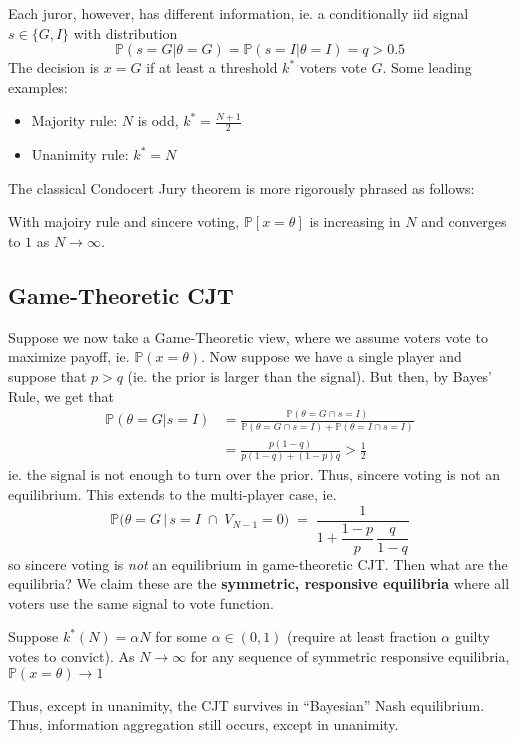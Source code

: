 \documentclass[9pt]{article}
\begin{document}
\begin{multicols}{2}
Each juror, however, has different information, ie. a conditionally iid
signal $s \in \{G,I\}$ with distribution 
\begin{equation}
    \mathbb{P}(s=G|\theta = G)= 
    \mathbb{P}(s=I|\theta=I) = q 
    > 0.5
\end{equation}
The decision is $x=G$ if at least a threshold $k^*$ voters vote $G$. Some leading examples:
\begin{itemize}
    \item Majority rule: $N$ is odd,
    $k^* = \frac{N+1}{2}$ 
    \item Unanimity rule: $k^* = N$
\end{itemize}

The classical Condocert Jury theorem is more rigorously phrased as follows:
\begin{theorem}
    With majoiry rule and sincere voting, 
    $\mathbb{P}[x = \theta]$ is increasing in $N$ 
    and converges to $1$ as $N \to \infty$.
\end{theorem}
\subsection{Game-Theoretic CJT}

Suppose we now take a Game-Theoretic view, where we assume voters vote
to maximize payoff, ie. $\mathbb{P}(x = \theta)$. Now suppose we have
a single player and suppose that $p > q$ (ie. the prior is larger than
the signal). But then, by Bayes' Rule, we get that 
\begin{align}
    \mathbb{P}(\theta = G|s = I) &= \frac{\mathbb{P}(\theta = G \cap s = I)}{\mathbb{P}(\theta = G \cap s = I) + \mathbb{P}(\theta = I \cap s = I)}\\ &= \frac{p(1-q)}{p(1-q)+(1-p)q} > \frac{1}{2}
\end{align}    
ie. the signal is not enough to turn over the prior. Thus, sincere
voting is not an equilibrium. This extends to the multi-player case, ie.
\begin{equation}
    \mathbb{P}\!\bigl(\theta = G \,\big|\, s = I \;\cap\; V_{N-1}=0\bigr)
\;=\;
\frac{1}{1 + \dfrac{1-p}{p} \,\dfrac{q}{1-q}}
\end{equation}
so sincere voting is \textit{not} an equilibrium in game-theoretic CJT. Then what are the
equilibria? We claim these are the \textbf{symmetric, responsive equilibria} where all 
voters use the same signal to vote function. 

\begin{theorem}
    Suppose $k^*(N) = \alpha N$ for some $\alpha \in (0, 1)$ (require at least fraction 
    $\alpha$ guilty votes to convict). As $N \to \infty$ for any sequence of symmetric responsive equilibria, $\mathbb{P}(x = \theta) \to 1$
\end{theorem}

Thus, except in unanimity, the CJT survives in ``Bayesian'' Nash equilibrium. Thus, 
information aggregation still occurs, except in unanimity. 


\end{multicols}
\end{document}
